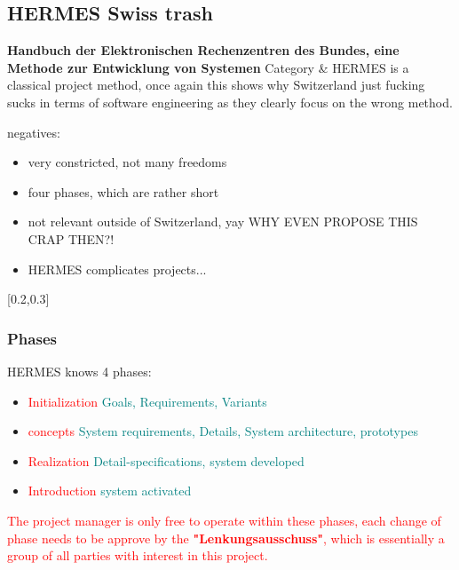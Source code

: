 \documentclass[main.tex,fontsize=12pt,paper=a4,paper=landscape,DIV=calc,]{scrartcl}
\begin{document}
\begin{multicols*}{2}
\subsection{HERMES Swiss trash}
\textbf{Handbuch der Elektronischen Rechenzentren des Bundes, eine Methode zur
Entwicklung von Systemen}\newline
Category \& HERMES is a classical project method, once again this shows why Switzerland just fucking sucks in terms of software engineering as they clearly focus on the wrong method.\newline
{}
{
negatives:\newline
\begin{itemize}
\item very constricted, not many freedoms
\item four phases, which are rather short
\item not relevant outside of Switzerland, yay WHY EVEN PROPOSE THIS CRAP THEN?!
\item HERMES complicates projects...
\end{itemize}
}[0.2,0.3]

\subsubsection{Phases} 
HERMES knows 4 phases:\newline
\begin{itemize}
  \item \textcolor{red}{Initialization} \textcolor{teal}{Goals, Requirements, Variants}
  \item \textcolor{red}{concepts} \textcolor{teal}{System requirements, Details, System architecture, prototypes}
  \item \textcolor{red}{Realization} \textcolor{teal}{Detail-specifications, system developed}
  \item \textcolor{red}{Introduction} \textcolor{teal}{system activated}
\end{itemize}
\textcolor{red}{The project manager is only free to operate within these phases, each change of phase needs to be approve by the \textbf{"Lenkungsausschuss"}, which is essentially a group of all parties with interest in this project.}


\end{multicols*}
\end{document}
